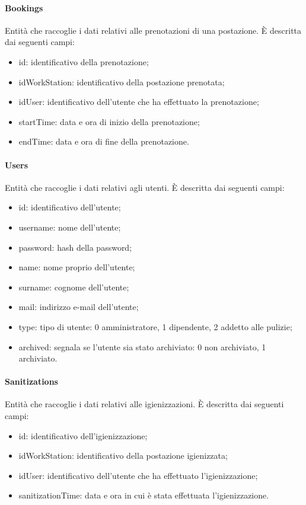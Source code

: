 \paragraph{Bookings}
Entità che raccoglie i dati relativi alle prenotazioni di una postazione. È descritta dai seguenti campi:
\begin{itemize}
	\item id: identificativo della prenotazione;
	\item idWorkStation: identificativo della postazione prenotata;
	\item idUser: identificativo dell'utente che ha effettuato la prenotazione;
	\item startTime: data e ora di inizio della prenotazione;
	\item endTime: data e ora di fine della prenotazione. 
\end{itemize}

\paragraph{Users}
Entità che raccoglie i dati relativi agli utenti. È descritta dai seguenti campi:
\begin{itemize}
	\item id: identificativo dell'utente;
	\item username: nome dell'utente;
	\item password: hash della password;
	\item name: nome proprio dell'utente;
	\item surname: cognome dell'utente;
	\item mail: indirizzo e-mail dell'utente;
	\item type: tipo di utente: 0 amministratore, 1 dipendente, 2 addetto alle pulizie;
	\item archived: segnala se l'utente sia stato archiviato: 0 non archiviato, 1 archiviato.
\end{itemize}

\paragraph{Sanitizations}
Entità che raccoglie i dati relativi alle igienizzazioni. È descritta dai seguenti campi:
\begin{itemize}
	\item id: identificativo dell'igienizzazione;
	\item idWorkStation: identificativo della postazione igienizzata;
	\item idUser: identificativo dell'utente che ha effettuato l'igienizzazione;
	\item sanitizationTime: data e ora in cui è stata effettuata l'igienizzazione.
\end{itemize}

